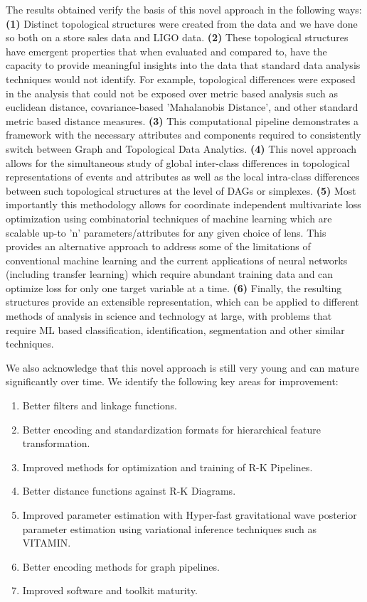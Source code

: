 The results obtained verify the basis of this novel approach in the following ways: \textbf{(1)} Distinct topological structures were created from the data and we have done so both on a store sales data and LIGO data. \textbf{(2)} These topological structures have emergent properties that when evaluated and compared to, have the capacity to provide meaningful insights into the data that standard data analysis techniques would not identify. For example, topological differences were exposed in the analysis that could not be exposed over metric based analysis such as euclidean distance, covariance-based 'Mahalanobis Distance', and other standard metric based distance measures. \textbf{(3)} This computational pipeline demonstrates a framework with the necessary attributes and components required to consistently switch between Graph and Topological Data Analytics.  \textbf{(4)} This novel approach allows for the simultaneous study of global inter-class differences in topological representations of events and attributes as well as the local intra-class differences between such topological structures at the level of DAGs or simplexes. \textbf{(5)} Most importantly this methodology allows for coordinate independent multivariate loss optimization using combinatorial techniques of machine learning which are scalable up-to 'n' parameters/attributes for any given choice of lens. This provides an alternative approach to address some of the limitations of  conventional machine learning and the current applications of neural networks (including transfer learning) which require abundant training data and can optimize loss for only one target variable at a time. \textbf{(6)} Finally, the resulting structures provide an extensible representation, which can be applied to different methods of analysis in science and technology at large, with problems that require ML based classification, identification, segmentation and other similar techniques.

We also acknowledge that this novel approach is still very young and can mature significantly over time. We identify the following key areas for improvement:

\begin{enumerate}
    \item{Better filters and linkage functions.}
    \item{Better encoding and standardization formats for hierarchical feature transformation.}
    \item{Improved methods for optimization and training of R-K Pipelines.}
    \item{Better distance functions against R-K Diagrams.}
    \item{Improved parameter estimation with Hyper-fast gravitational wave posterior parameter estimation using variational inference techniques such as VITAMIN.}
    \item{Better encoding methods for graph pipelines.}
    \item{Improved software and toolkit maturity.}
\end{enumerate}

